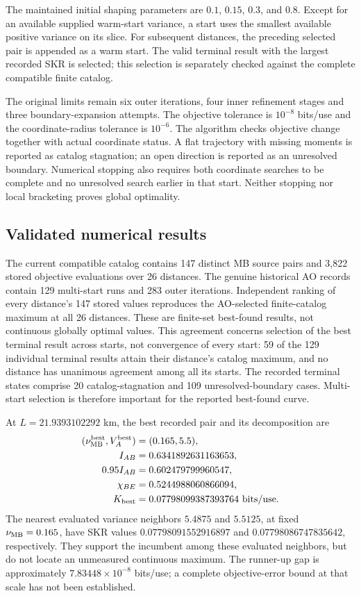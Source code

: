 The maintained initial shaping parameters are $0.1$, $0.15$, $0.3$, and $0.8$.
Except for an available supplied warm-start variance, a start uses the smallest
available positive variance on its slice. For subsequent distances, the
preceding selected pair is appended as a warm start. The valid terminal result
with the largest recorded SKR is selected; this selection is separately checked
against the complete compatible finite catalog.

The original limits remain six outer iterations, four inner refinement stages
and three boundary-expansion attempts. The objective tolerance is
$10^{-8}$ bits/use and the coordinate-radius tolerance is $10^{-6}$.
The algorithm checks objective change together with actual coordinate status.
A flat trajectory with missing moments is reported as catalog stagnation; an
open direction is reported as an unresolved boundary. Numerical stopping also
requires both coordinate searches to be complete and no unresolved search earlier
in that start. Neither stopping nor local bracketing proves global optimality.



\subsection{Validated numerical results}
The current compatible catalog contains 147 distinct MB source pairs and
3,822 stored objective evaluations over 26 distances. The genuine historical
AO records contain 129 multi-start runs and 283 outer iterations. Independent
ranking of every distance's 147 stored values reproduces the AO-selected
finite-catalog maximum at all 26 distances. These are finite-set best-found
results, not continuous globally optimal values.
This agreement concerns selection of the best terminal result across starts,
not convergence of every start: 59 of the 129 individual terminal results
attain their distance's catalog maximum, and no distance has unanimous
agreement among all its starts. The recorded terminal states comprise 20
catalog-stagnation and 109 unresolved-boundary cases. Multi-start selection
is therefore important for the reported best-found curve.

At $L=21.9393102292$ km, the best recorded pair and its decomposition are
\begin{align}
 (\nu_{\rm MB}^{\rm best},V_A^{\rm best})&=(0.165,5.5),\nonumber\\
 I_{AB}&=0.6341892631163653,\nonumber\\
 0.95I_{AB}&=0.602479799960547,\nonumber\\
 \chi_{BE}&=0.5244988060866094,\nonumber\\
 K_{\rm best}&=0.07798099387393764\ \text{bits/use}.
\end{align}
The nearest evaluated variance neighbors $5.4875$ and $5.5125$, at fixed
$\nu_{\rm MB}=0.165$, have SKR values $0.07798091552916897$ and
$0.07798086747835642$, respectively. They support the incumbent among these
evaluated neighbors, but do not locate an unmeasured continuous maximum.
The runner-up gap is approximately $7.83448\times10^{-8}$ bits/use; a complete
objective-error bound at that scale has not been established.

